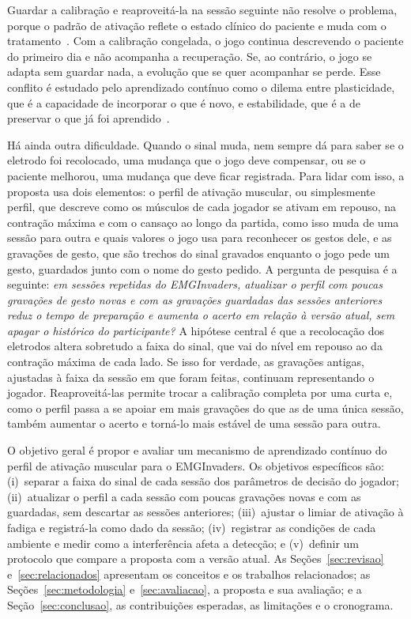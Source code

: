 \documentclass[runningheads]{llncs}
\begin{document}
Guardar a calibração e reaproveitá-la na sessão seguinte não resolve o problema, porque o padrão de ativação reflete o estado clínico do paciente e muda com o tratamento~\citep{machetanz2022facial}. Com a calibração congelada, o jogo continua descrevendo o paciente do primeiro dia e não acompanha a recuperação. Se, ao contrário, o jogo se adapta sem guardar nada, a evolução que se quer acompanhar se perde. Esse conflito é estudado pelo aprendizado contínuo como o dilema entre plasticidade, que é a capacidade de incorporar o que é novo, e estabilidade, que é a de preservar o que já foi aprendido~\citep{parisi2019continual}.

Há ainda outra dificuldade. Quando o sinal muda, nem sempre dá para saber se o eletrodo foi recolocado, uma mudança que o jogo deve compensar, ou se o paciente melhorou, uma mudança que deve ficar registrada. Para lidar com isso, a proposta usa dois elementos: o perfil de ativação muscular, ou simplesmente perfil, que descreve como os músculos de cada jogador se ativam em repouso, na contração máxima e com o cansaço ao longo da partida, como isso muda de uma sessão para outra e quais valores o jogo usa para reconhecer os gestos dele, e as gravações de gesto, que são trechos do sinal gravados enquanto o jogo pede um gesto, guardados junto com o nome do gesto pedido. A pergunta de pesquisa é a seguinte: \textit{em sessões repetidas do EMGInvaders, atualizar o perfil com poucas gravações de gesto novas e com as gravações guardadas das sessões anteriores reduz o tempo de preparação e aumenta o acerto em relação à versão atual, sem apagar o histórico do participante?} A hipótese central é que a recolocação dos eletrodos altera sobretudo a faixa do sinal, que vai do nível em repouso ao da contração máxima de cada lado. Se isso for verdade, as gravações antigas, ajustadas à faixa da sessão em que foram feitas, continuam representando o jogador. Reaproveitá-las permite trocar a calibração completa por uma curta e, como o perfil passa a se apoiar em mais gravações do que as de uma única sessão, também aumentar o acerto e torná-lo mais estável de uma sessão para outra.

O objetivo geral é propor e avaliar um mecanismo de aprendizado contínuo do perfil de ativação muscular para o EMGInvaders. Os objetivos específicos são: (i)~separar a faixa do sinal de cada sessão dos parâmetros de decisão do jogador; (ii)~atualizar o perfil a cada sessão com poucas gravações novas e com as guardadas, sem descartar as sessões anteriores; (iii)~ajustar o limiar de ativação à fadiga e registrá-la como dado da sessão; (iv)~registrar as condições de cada ambiente e medir como a interferência afeta a detecção; e (v)~definir um protocolo que compare a proposta com a versão atual. As Seções~\ref{sec:revisao} e~\ref{sec:relacionados} apresentam os conceitos e os trabalhos relacionados; as Seções~\ref{sec:metodologia} e~\ref{sec:avaliacao}, a proposta e sua avaliação; e a Seção~\ref{sec:conclusao}, as contribuições esperadas, as limitações e o cronograma.
\end{document}
